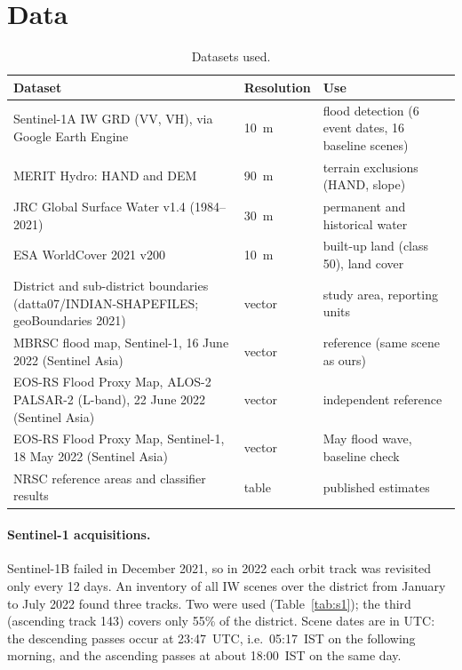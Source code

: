 \documentclass[11pt,a4paper]{article}
\begin{document}
\section{Data}
\begin{table}[H]
\centering\small
\caption{Datasets used.}
\label{tab:data}
\begin{tabularx}{\linewidth}{>{\raggedright}p{4.6cm}>{\raggedright}p{3.0cm}X}
\toprule
Dataset & Resolution & Use\\
\midrule
Sentinel-1A IW GRD (VV, VH), via Google Earth Engine & \SI{10}{m} & flood detection (6 event dates, 16 baseline scenes)\\
MERIT Hydro: HAND and DEM & \SI{90}{m} & terrain exclusions (HAND, slope)\\
JRC Global Surface Water v1.4 (1984--2021) & \SI{30}{m} & permanent and historical water\\
ESA WorldCover 2021 v200 & \SI{10}{m} & built-up land (class 50), land cover\\
District and sub-district boundaries (datta07/INDIAN-SHAPEFILES; geoBoundaries 2021) & vector & study area, reporting units\\
MBRSC flood map, Sentinel-1, 16 June 2022 (Sentinel Asia) & vector & reference (same scene as ours)\\
EOS-RS Flood Proxy Map, ALOS-2 PALSAR-2 (L-band), 22 June 2022 (Sentinel Asia) & vector & independent reference\\
EOS-RS Flood Proxy Map, Sentinel-1, 18 May 2022 (Sentinel Asia) & vector & May flood wave, baseline check\\
NRSC reference areas and classifier results \cite{irukumati} & table & published estimates\\
\bottomrule
\end{tabularx}
\end{table}

\paragraph{Sentinel-1 acquisitions.} Sentinel-1B failed in December 2021, so in 2022 each orbit track
was revisited only every 12 days. An inventory of all IW scenes over the district from January to July
2022 found three tracks. Two were used (Table~\ref{tab:s1}); the third (ascending track 143) covers only
55\% of the district. Scene dates are in UTC: the descending passes occur at 23:47~UTC, i.e.\ 05:17~IST
on the following morning, and the ascending passes at about 18:00~IST on the same day.
\end{document}

